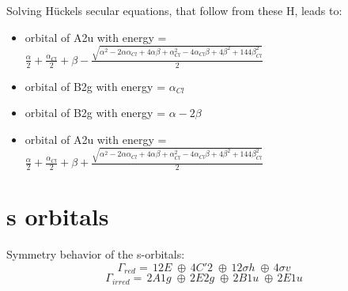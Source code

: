 \documentclass[12pt,a4paper]{article}
\begin{document}
Solving Hückels secular equations, that follow from these H, leads to:
\begin{itemize}
\item orbital of A2u with energy = $\frac{\alpha}{2} + \frac{\alpha_{Cl}}{2} + \beta - \frac{\sqrt{\alpha^{2} - 2 \alpha \alpha_{Cl} + 4 \alpha \beta + \alpha_{Cl}^{2} - 4 \alpha_{Cl} \beta + 4 \beta^{2} + 144 \beta_{Cl}^{2}}}{2}$
\item orbital of B2g with energy = $\alpha_{Cl}$
\item orbital of B2g with energy = $\alpha - 2 \beta$
\item orbital of A2u with energy = $\frac{\alpha}{2} + \frac{\alpha_{Cl}}{2} + \beta + \frac{\sqrt{\alpha^{2} - 2 \alpha \alpha_{Cl} + 4 \alpha \beta + \alpha_{Cl}^{2} - 4 \alpha_{Cl} \beta + 4 \beta^{2} + 144 \beta_{Cl}^{2}}}{2}$
\end{itemize}



\newpage \section*{s orbitals}
Symmetry behavior of the s-orbitals:
$$\Gamma_{red} = \,12 E\;\oplus{}\,4 C'2\;\oplus{}\,12 \sigma h\;\oplus{}\,4 \sigma v\;$$
$$\Gamma_{irred} = \,2 A1g\;\oplus{}\,2 E2g\;\oplus{}\,2 B1u\;\oplus{}\,2 E1u\;$$
\end{document}
